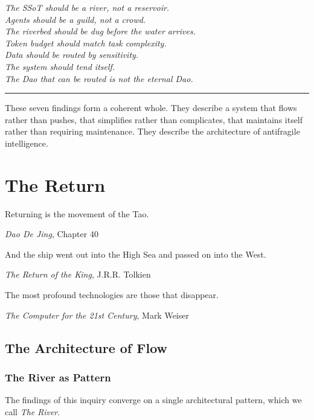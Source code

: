 \documentclass[12pt,a4paper,oneside]{book}
\begin{document}
\emph{The SSoT should be a river, not a reservoir.}\\
\emph{Agents should be a guild, not a crowd.}\\
\emph{The riverbed should be dug before the water arrives.}\\
\emph{Token budget should match task complexity.}\\
\emph{Data should be routed by sensitivity.}\\
\emph{The system should tend itself.}\\
\emph{The Dao that can be routed is not the eternal Dao.}

\begin{center}
\rule{0.5\textwidth}{0.5pt}
\end{center}

These seven findings form a coherent whole. They describe a system that flows rather than pushes, that simplifies rather than complicates, that maintains itself rather than requiring maintenance. They describe the architecture of antifragile intelligence.

\part{The Return}
\label{part:return}

\epigraph{Returning is the movement of the Tao.}{\textit{Dao De Jing}, Chapter 40}

\epigraph{And the ship went out into the High Sea and passed on into the West.}{\textit{The Return of the King}, J.R.R. Tolkien}

\epigraph{The most profound technologies are those that disappear.}{\textit{The Computer for the 21st Century}, Mark Weiser}

\chapter{The Architecture of Flow}

\section{The River as Pattern}

The findings of this inquiry converge on a single architectural pattern, which we call \emph{The River}.
\end{document}

